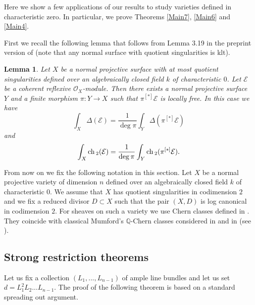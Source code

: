 \documentclass[12pt]{article}
\theoremstyle{plain}
\newtheorem{Lemma}[Thm]{\sc Lemma}
\theoremstyle{definition}
\theoremstyle{remark}
\newcommand{\QQ}{{\mathbb Q}}
\newcommand{\cE}{{\mathcal E}}
\newcommand{\cO}{{\mathcal O}}
\newcommand{\ch}{{\mathop{\rm ch \, }}}
\begin{document}
Here we show a few applications of our results to study varieties defined in characteristic zero. In particular, we prove Theorems \ref{Main7}, \ref{Main6} and \ref{Main4}.

\medskip

First we recall the following lemma that follows from Lemma 3.19 in the preprint version of  \cite{GKPT2} (note that any normal surface with quotient singularities is klt).

\begin{Lemma}\label{surface-cover}
	Let $X$ be a normal projective surface with at most quotient singularities defined over an algebraically closed field $k$ of characteristic $0$.
	Let $\cE$ be a coherent reflexive $\cO_X$-module. 
	Then there exists a normal projective surface $Y$ and a finite morphism $\pi: Y\to X$ 
	such that  $\pi ^{[*]}\cE$ is locally free. In this case we have
	$$\int_{X}\Delta (\cE)= \frac {1}{\deg \pi} \int_Y\Delta (\pi^{[*]}\cE)$$
	and 
	$$\int_{X}\ch _2 (\cE)= \frac {1}{\deg \pi} \int_Y\ch_2 (\pi^{[*]}\cE).$$
\end{Lemma}

\medskip
From now on we fix the following notation in this section.
Let $X$ be a normal projective variety of dimension $n$ defined over an algebraically closed field $k$ of characteristic $0$. We assume that $X$ has quotient singularities in codimension $2$ and we fix a reduced divisor $D\subset X$ such that the pair $(X,D)$ is log canonical in codimension $2$. For sheaves on such a variety we use Chern classes defined in \cite[5.3]{La-Chern}. They coincide with classical Mumford's $\QQ$-Chern classes considered in \cite[Chapter 10]{Ko} and in \cite[Theorem  3.13]{GKPT2} (see \cite[Remark 5.9]{La-Chern}). 

\subsection{Strong restriction theorems}

Let us fix a collection  $(L_1, ...,L_{n-1})$ of ample line bundles and let
us set  $d=L_1^2L_2...L_{n-1}$.
The proof of the following theorem is based on  a standard spreading out argument.
\end{document}
